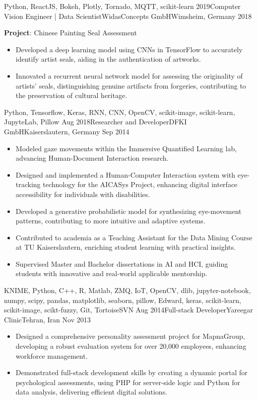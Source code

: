 \begin{experiences}
{\begin{itemize}
		\end{itemize}
	}
	{Python, ReactJS, Bokeh, Plotly, Tornado, MQTT, scikit-learn}
	\emptySeparator
	\experience
	{2019}{Computer Vision Engineer | Data Scientist}{WidasConcepts GmbH}{Wimsheim, Germany}
	{2018} {
		\vspace{0.1cm}
		\textbf{Project}: Chinese Painting Seal Assessment
		\begin{itemize}
    \item Developed a deep learning model using CNNs in TensorFlow to accurately identify artist seals, aiding in the authentication of artworks.
\item Innovated a recurrent neural network model for assessing the originality of artists' seals, distinguishing genuine artifacts from forgeries, contributing to the preservation of cultural heritage.


		\end{itemize}
	}
	{Python, Tensorflow, Keras, RNN, CNN, OpenCV, scikit-image, scikit-learn, JupyteLab, Pillow}
	\emptySeparator
	\experience
	{Aug 2018}{Researcher and Developer}{DFKI GmbH}{Kaiserslautern, Germany}
	{Sep 2014} {
		\begin{itemize}
    \item Modeled gaze movements within the Immersive Quantified Learning lab, advancing Human-Document Interaction research.
\item Designed and implemented a Human-Computer Interaction system with eye-tracking technology for the AICASys Project, enhancing digital interface accessibility for individuals with disabilities.
\item Developed a generative probabilistic model for synthesizing eye-movement patterns, contributing to more intuitive and adaptive systems.
\item Contributed to academia as a Teaching Assistant for the Data Mining Course at TU Kaiserslautern, enriching student learning with practical insights.
\item Supervised Master and Bachelor dissertations in AI and HCI, guiding students with innovative and real-world applicable mentorship.


		\end{itemize}
	}
	{KNIME, Python, C++, R, Matlab, ZMQ, IoT, OpenCV, dlib, jupyter-notebook, numpy, scipy, pandas, matplotlib, seaborn, pillow, Edward, keras, scikit-learn, scikit-image, scikt-fuzzy, Git, TortoiseSVN}
	\emptySeparator
	\experience
	{Aug 2014}{Full-stack Developer}{Yareegar Clinic}{Tehran, Iran}
	{Nov 2013} {
		\begin{itemize}
    \item Designed a comprehensive personality assessment project for MapnaGroup, developing a robust evaluation system for over 20,000 employees, enhancing workforce management.
\item Demonstrated full-stack development skills by creating a dynamic portal for psychological assessments, using PHP for server-side logic and Python for data analysis, delivering efficient digital solutions.



\end{itemize}}
\end{experiences}
